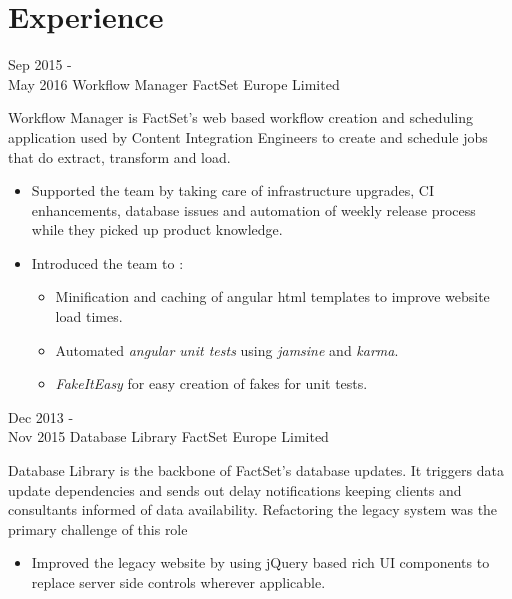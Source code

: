 \documentclass[a4paper]{twentysecondcv} %
\begin{document}
\makeprofile %


\section{Experience}

\begin{twenty} %
  \twentyitem
      {Sep 2015 - \\May 2016}
      {Workflow Manager}
      {FactSet Europe Limited}
      {}
      {
        {Workflow Manager is FactSet’s web based workflow creation and scheduling application used by Content Integration Engineers to create and schedule jobs that do extract, transform and load.}
        {\begin{itemize}
          \item {Supported the team by taking care of infrastructure upgrades, CI enhancements, database issues and automation of weekly release process while they picked up product knowledge.}
          \item {Introduced the team to :}
            \begin{itemize}
            \item {Minification and caching of angular html templates to improve website load times.}
            \item {Automated \emph{angular unit tests} using \emph{jamsine} and \emph{karma}.}
            \item {\emph{FakeItEasy} for easy creation of fakes for unit tests.}
            \end{itemize}
        \end{itemize}}
      }
  \twentyitem
      {Dec 2013 - \\Nov 2015}
      {Database Library}
      {FactSet Europe Limited}
      {}
      {
        {Database Library is the backbone of FactSet’s database updates. It triggers data update dependencies and sends out delay notifications keeping clients and consultants informed of data availability. Refactoring the legacy system was the primary challenge of this role}
        {\begin{itemize}
          \item {Improved the legacy website by using jQuery based rich UI components to replace server side controls wherever applicable.}

\end{itemize}}}
\end{twenty}
\end{document}
